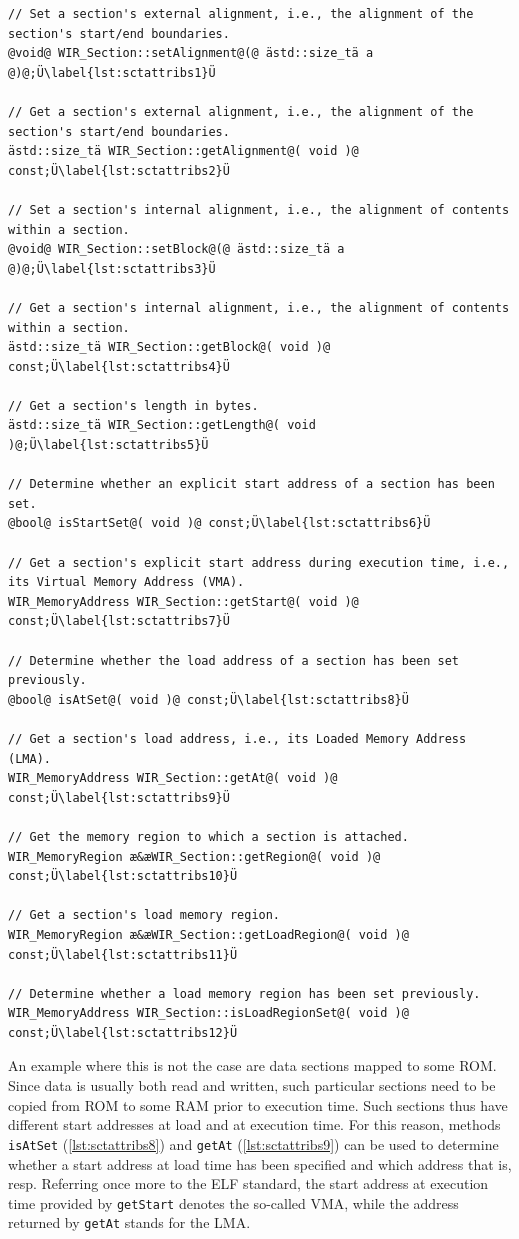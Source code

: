 \begin{lstlisting}[style=code,float=ht,caption={Characteristic Attributes of Class \texttt{WIR\_Section}},label=lst:sctattribs]
// Set a section's external alignment, i.e., the alignment of the section's start/end boundaries.
@void@ WIR_Section::setAlignment@(@ ästd::size_tä a @)@;Ü\label{lst:sctattribs1}Ü

// Get a section's external alignment, i.e., the alignment of the section's start/end boundaries.
ästd::size_tä WIR_Section::getAlignment@( void )@ const;Ü\label{lst:sctattribs2}Ü

// Set a section's internal alignment, i.e., the alignment of contents within a section.
@void@ WIR_Section::setBlock@(@ ästd::size_tä a @)@;Ü\label{lst:sctattribs3}Ü

// Get a section's internal alignment, i.e., the alignment of contents within a section.
ästd::size_tä WIR_Section::getBlock@( void )@ const;Ü\label{lst:sctattribs4}Ü

// Get a section's length in bytes.
ästd::size_tä WIR_Section::getLength@( void )@;Ü\label{lst:sctattribs5}Ü

// Determine whether an explicit start address of a section has been set.
@bool@ isStartSet@( void )@ const;Ü\label{lst:sctattribs6}Ü

// Get a section's explicit start address during execution time, i.e., its Virtual Memory Address (VMA).
WIR_MemoryAddress WIR_Section::getStart@( void )@ const;Ü\label{lst:sctattribs7}Ü

// Determine whether the load address of a section has been set previously.
@bool@ isAtSet@( void )@ const;Ü\label{lst:sctattribs8}Ü

// Get a section's load address, i.e., its Loaded Memory Address (LMA).
WIR_MemoryAddress WIR_Section::getAt@( void )@ const;Ü\label{lst:sctattribs9}Ü

// Get the memory region to which a section is attached.
WIR_MemoryRegion æ&æWIR_Section::getRegion@( void )@ const;Ü\label{lst:sctattribs10}Ü

// Get a section's load memory region.
WIR_MemoryRegion æ&æWIR_Section::getLoadRegion@( void )@ const;Ü\label{lst:sctattribs11}Ü

// Determine whether a load memory region has been set previously.
WIR_MemoryAddress WIR_Section::isLoadRegionSet@( void )@ const;Ü\label{lst:sctattribs12}Ü
\end{lstlisting}

An example where this is not the case are data sections mapped to some \gls{ROM}.
Since data is usually both read and written, such particular sections need to be copied from \gls{ROM} to some \gls{RAM} prior to execution time.
Such sections thus have different start addresses at load and at execution time.
For this reason, methods \texttt{isAtSet} (\cref{lst:sctattribs8}) and \texttt{getAt} (\cref{lst:sctattribs9}) can be used to determine whether a start address at load time has been specified and which address that is, resp.
Referring once more to the \gls{ELF} standard, the start address at execution time provided by \texttt{getStart} denotes the so-called \gls{VMA}, while the address returned by \texttt{getAt} stands for the \gls{LMA}.

